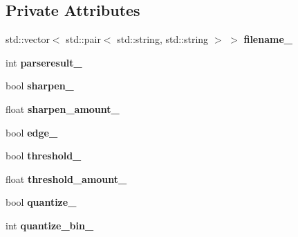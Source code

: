 \subsection*{Private Attributes}
\begin{DoxyCompactItemize}
\item 
std\+::vector$<$ std\+::pair$<$ std\+::string, std\+::string $>$ $>$ {\bfseries filename\+\_\+}\hypertarget{classimage__tools_1_1MIACmd_aeb963f50a732176ca6a6c62989157c00}{}\label{classimage__tools_1_1MIACmd_aeb963f50a732176ca6a6c62989157c00}

\item 
int {\bfseries parseresult\+\_\+}\hypertarget{classimage__tools_1_1MIACmd_a3b79094eac0bb38cbaf631b7ee519632}{}\label{classimage__tools_1_1MIACmd_a3b79094eac0bb38cbaf631b7ee519632}

\item 
bool {\bfseries sharpen\+\_\+}\hypertarget{classimage__tools_1_1MIACmd_a5353e46f340420c7b2a3e39e8249892a}{}\label{classimage__tools_1_1MIACmd_a5353e46f340420c7b2a3e39e8249892a}

\item 
float {\bfseries sharpen\+\_\+amount\+\_\+}\hypertarget{classimage__tools_1_1MIACmd_ad8ac8d66dd5aba3d31694c2832ff6feb}{}\label{classimage__tools_1_1MIACmd_ad8ac8d66dd5aba3d31694c2832ff6feb}

\item 
bool {\bfseries edge\+\_\+}\hypertarget{classimage__tools_1_1MIACmd_ad0a4927a1f21f9f2e6835a6a8b173ac4}{}\label{classimage__tools_1_1MIACmd_ad0a4927a1f21f9f2e6835a6a8b173ac4}

\item 
bool {\bfseries threshold\+\_\+}\hypertarget{classimage__tools_1_1MIACmd_aee17c2f5ecc05a5606e4bd927e4a98c1}{}\label{classimage__tools_1_1MIACmd_aee17c2f5ecc05a5606e4bd927e4a98c1}

\item 
float {\bfseries threshold\+\_\+amount\+\_\+}\hypertarget{classimage__tools_1_1MIACmd_a252a3d237ea2e362dd241f466b305d80}{}\label{classimage__tools_1_1MIACmd_a252a3d237ea2e362dd241f466b305d80}

\item 
bool {\bfseries quantize\+\_\+}\hypertarget{classimage__tools_1_1MIACmd_a36368e8e815a6e6fa9cd1897f74a2da9}{}\label{classimage__tools_1_1MIACmd_a36368e8e815a6e6fa9cd1897f74a2da9}

\item 
int {\bfseries quantize\+\_\+bin\+\_\+}\hypertarget{classimage__tools_1_1MIACmd_ad4815cfee4612da7c0573eeef5f2c21d}{}\label{classimage__tools_1_1MIACmd_ad4815cfee4612da7c0573eeef5f2c21d}


\end{DoxyCompactItemize}
